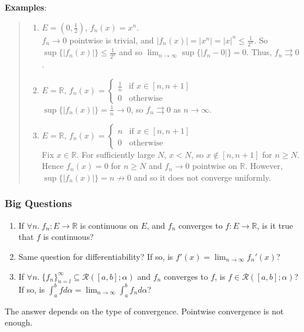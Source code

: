 \documentclass[11pt]{article}
\begin{document}
\textbf{Examples}:
\begin{quote}\vspace{-0.3cm}
	\begin{enumerate}
	\item $E = (0, \frac{1}{2})$, $f_n(x) = x^n$.\\
	$f_n \to 0$ pointwise is trivial, and $|f_n(x)| = |x^n| = |x|^n \leq \frac{1}{2^n}$. So $\sup\{|f_n(x)|\} \leq \frac{1}{2^n}$ and so $\lim_{n \to \infty} \sup\{|f_n - 0|\} = 0$. Thus, $f_n \rightrightarrows 0$.

	\item $E = \mathbb{R}$, $f_n(x) = \begin{cases}
	\frac{1}{n} & \text{if } x \in [n,n+1]\\
	0 & \text{otherwise}
	\end{cases}$\\
	$\sup\{|f_n(x)|\} = \frac{1}{n} \to 0$, so $f_n \rightrightarrows 0$ as $n \to \infty$.

	\item $E = \mathbb{R}$, $f_n(x) = \begin{cases}
	n & \text{if } x \in [n, n+1]\\
	0 & \text{otherwise}
	\end{cases}$\\
	Fix $x \in \mathbb{R}$. For sufficiently large $N$, $x < N$, so $x \notin [n, n+1]$ for $n \geq N$. Hence $f_n(x) = 0$ for $n \geq N$ and $f_n \to 0$ pointwise on $\mathbb{R}$. However, $\sup\{|f_n(x)|\} = n \not \to 0$ and so it does not converge uniformly.
	\end{enumerate}
\end{quote}

\subsubsection{Big Questions}

\begin{enumerate}
\item If $\forall n.\; f_n : E \to \mathbb{R}$ is continuous on $E$, and $f_n$ converges to $f : E \to \mathbb{R}$, is it true that $f$ is continuous?
\item Same question for differentiability? If so, is $f'(x) = \lim_{n \to \infty} f_n'(x)$?
\item If $\forall n.\; \{f_n\}_{n=l}^\infty \subseteq \mathcal{R}([a,b]; \alpha)$ and $f_n$ converges to $f$, is $f \in \mathcal{R}([a,b]; \alpha)$? If so, is $\int_a^b f d\alpha = \lim_{n \to \infty} \int_a^b f_n d\alpha$?
\end{enumerate}
The answer depends on the type of convergence. Pointwise convergence is not enough.
\end{document}

